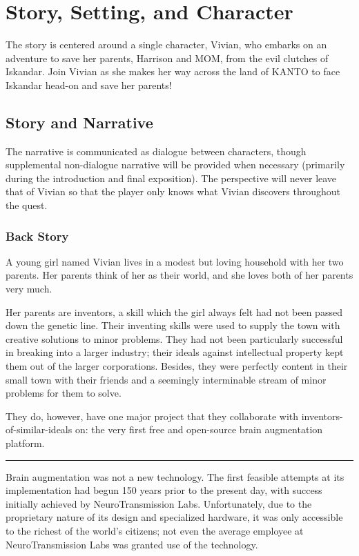\documentclass[12pt,titlepage]{article}
\newcommand\protagonist{Vivian\xspace}
\newcommand\dad{Harrison\xspace}
\newcommand\mom{MOM\xspace}
\newcommand\evilcorp{Iskandar\xspace}
\newcommand\world{KANTO\xspace}
\newcommand\sep{\rule{2.5in}{0.1mm}}
\begin{document}
\newpage
\section{Story, Setting, and Character}

The story is centered around a single character, \protagonist, who embarks on an
adventure to save her parents, \dad and \mom, from the evil clutches of
\evilcorp. Join \protagonist as she makes her way across the land of \world to
face \evilcorp head-on and save her parents!

\subsection{Story and Narrative}

The narrative is communicated as dialogue between characters, though
supplemental non-dialogue narrative will be provided when necessary (primarily
during the introduction and final exposition). The perspective will never leave
that of \protagonist so that the player only knows what \protagonist discovers
throughout the quest.

\subsubsection{Back Story}

A young girl named Vivian lives in a modest but loving household with her two
parents. Her parents think of her as their world, and she loves both of her
parents very much.

Her parents are inventors, a skill which the girl always felt had not been
passed down the genetic line. Their inventing skills were used to supply the
town with creative solutions to minor problems. They had not been particularly
successful in breaking into a larger industry; their ideals against intellectual
property kept them out of the larger corporations. Besides, they were perfectly
content in their small town with their friends and a seemingly interminable
stream of minor problems for them to solve.

They do, however, have one major project that they collaborate with
inventors-of-similar-ideals on: the very first free and open-source brain
augmentation platform.

\sep

Brain augmentation was not a new technology. The first feasible attempts at its
implementation had begun 150 years prior to the present day, with success
initially achieved by NeuroTransmission Labs. Unfortunately, due to the
proprietary nature of its design and specialized hardware, it was only
accessible to the richest of the world's citizens; not even the average employee
at NeuroTransmission Labs was granted use of the technology.
\end{document}

